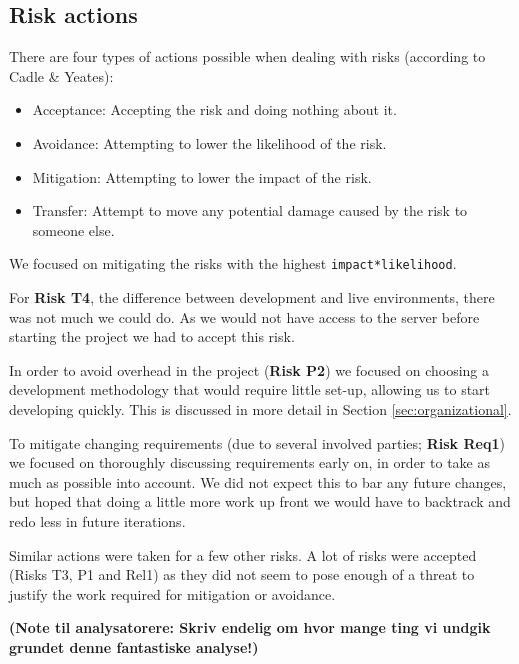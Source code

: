 \subsection{Risk actions}
There are four types of actions possible when dealing with risks (according to Cadle \& Yeates):

\begin{itemize}
    \item Acceptance: Accepting the risk and doing nothing about it.
    \item Avoidance: Attempting to lower the likelihood of the risk.
    \item Mitigation: Attempting to lower the impact of the risk.
    \item Transfer: Attempt to move any potential damage caused by the risk to someone else.
\end{itemize}

We focused on mitigating the risks with the highest \verb+impact*likelihood+.

For \textbf{Risk T4}, the difference between development and live environments, there was not much we could
do. As we would not have access to the server before starting the project we had to accept this risk.

In order to avoid overhead in the project (\textbf{Risk P2}) we focused on choosing a development
methodology that would require little set-up, allowing us to start developing quickly. This is discussed in
more detail in Section \ref{sec:organizational}.

To mitigate changing requirements (due to several involved parties; \textbf{Risk Req1}) we focused on
thoroughly discussing requirements early on, in order to take as much as possible into account. We did not
expect this to bar any future changes, but hoped that doing a little more work up front we would have to
backtrack and redo less in future iterations.

Similar actions were taken for a few other risks. A lot of risks were accepted (Risks T3, P1 and Rel1) as
they did not seem to pose enough of a threat to justify the work required for mitigation or avoidance.

\textbf{(Note til analysatorere: Skriv endelig om hvor mange ting vi undgik grundet denne fantastiske analyse!)}